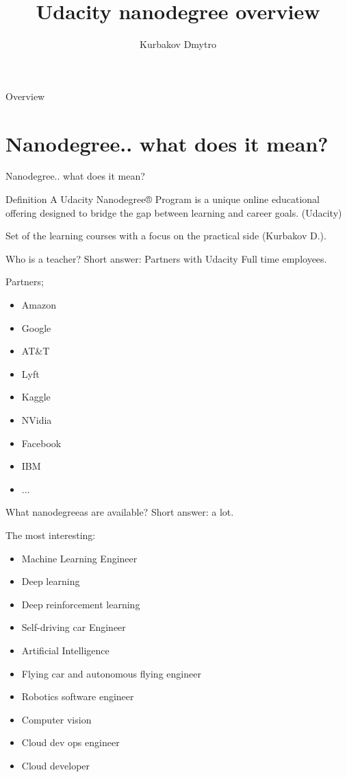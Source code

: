 \documentclass{beamer}
\title{Udacity nanodegree overview}
\author{Kurbakov Dmytro}
\begin{document}
\begin{frame}
\titlepage
\end{frame}

\begin{frame}{Overview}
\tableofcontents
\end{frame}


\section{Nanodegree.. what does it mean?}

\begin{frame}
\begin{center}
\huge Nanodegree.. what does it mean?
\end{center}
\end{frame}

\begin{frame}[fragile]{Definition}
A Udacity Nanodegree® Program is a unique online educational offering designed to bridge the gap between learning and career goals. (Udacity)

Set of the learning courses with a focus on the practical side (Kurbakov D.). 

\end{frame}

\begin{frame}[fragile]{Who is a teacher?}
Short answer: Partners with Udacity Full time employees.

Partners;
\begin{itemize}
\item Amazon
\item Google
\item AT\&T
\item Lyft
\item Kaggle
\item NVidia
\item Facebook
\item IBM
\item ...
\end{itemize}

\end{frame}

\begin{frame}[fragile]{What nanodegreeas are available?}
Short answer: a lot.

The most interesting:
\begin{itemize}
\item Machine Learning Engineer
\item Deep learning
\item Deep reinforcement learning
\item Self-driving car Engineer
\item Artificial Intelligence
\item Flying car and autonomous flying engineer
\item Robotics software engineer
\item Computer vision
\item Cloud dev ops engineer
\item Cloud developer
\end{itemize}

\end{frame}
\end{document}
